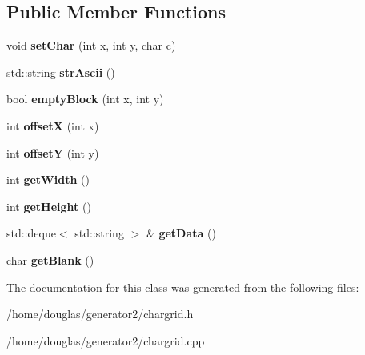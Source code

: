 \subsection*{Public Member Functions}
\begin{DoxyCompactItemize}
\item 
void {\bfseries set\+Char} (int x, int y, char c)\hypertarget{classCharGrid_a6617ec4da32eabd1f02fbadc4429eb59}{}\label{classCharGrid_a6617ec4da32eabd1f02fbadc4429eb59}

\item 
std\+::string {\bfseries str\+Ascii} ()\hypertarget{classCharGrid_abefadac3dbf2e1945e77bd41e715c8cc}{}\label{classCharGrid_abefadac3dbf2e1945e77bd41e715c8cc}

\item 
bool {\bfseries empty\+Block} (int x, int y)\hypertarget{classCharGrid_ac5a849bf687de48bc78b213992bea0f1}{}\label{classCharGrid_ac5a849bf687de48bc78b213992bea0f1}

\item 
int {\bfseries offsetX} (int x)\hypertarget{classCharGrid_a9dd1b0ebc5e58f3155b58fc143e6508b}{}\label{classCharGrid_a9dd1b0ebc5e58f3155b58fc143e6508b}

\item 
int {\bfseries offsetY} (int y)\hypertarget{classCharGrid_a187c68e52715cbbe753b20e5b458947c}{}\label{classCharGrid_a187c68e52715cbbe753b20e5b458947c}

\item 
int {\bfseries get\+Width} ()\hypertarget{classCharGrid_a50f4c607bb14624e0465a8f1fd7a6462}{}\label{classCharGrid_a50f4c607bb14624e0465a8f1fd7a6462}

\item 
int {\bfseries get\+Height} ()\hypertarget{classCharGrid_aeeb667243d37b38b8618eac646c07f69}{}\label{classCharGrid_aeeb667243d37b38b8618eac646c07f69}

\item 
std\+::deque$<$ std\+::string $>$ \& {\bfseries get\+Data} ()\hypertarget{classCharGrid_ad50d9c36ee0861dd994bf686f1afb537}{}\label{classCharGrid_ad50d9c36ee0861dd994bf686f1afb537}

\item 
char {\bfseries get\+Blank} ()\hypertarget{classCharGrid_a75a46545b1b48de3376b85929d5eb0c4}{}\label{classCharGrid_a75a46545b1b48de3376b85929d5eb0c4}

\end{DoxyCompactItemize}


The documentation for this class was generated from the following files\+:\begin{DoxyCompactItemize}
\item 
/home/douglas/generator2/chargrid.\+h\item 
/home/douglas/generator2/chargrid.\+cpp\end{DoxyCompactItemize}
